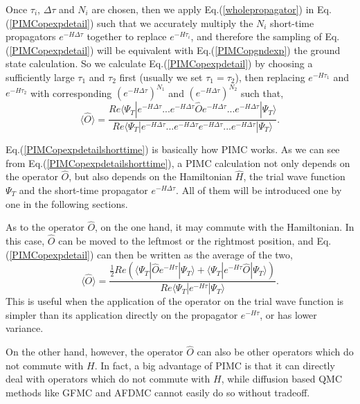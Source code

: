 \documentclass[12pt,letterpaper,UTF8]{report}
\begin{document}
Once $\tau_i$, $\Delta \tau$ and $N_i$ are chosen, then we apply Eq.(\ref{wholepropagator}) in Eq.(\ref{PIMCopexpdetail}) such that we accurately multiply the $N_i$ short-time propagators $e^{-H \Delta \tau}$ together to replace $e^{-H \tau_i}$, and therefore the sampling of Eq.(\ref{PIMCopexpdetail}) will be equivalent with Eq.(\ref{PIMCopgndexp}) the ground state calculation.
So we calculate Eq.(\ref{PIMCopexpdetail}) by choosing a sufficiently large $\tau_1$ and $\tau_2$ first (usually we set $\tau_1=\tau_2$), then replacing $e^{-H \tau_1}$ and $e^{-H \tau_2}$ with corresponding $(e^{-H \Delta \tau})^{N_1}$ and $(e^{-H \Delta \tau})^{N_2}$ such that,
\begin{equation}
\langle \hat{O} \rangle
= \frac{ Re  \langle \Psi_T| e^{-H \Delta \tau}...e^{-H \Delta \tau} \hat{O} e^{-H \Delta \tau} ...e^{-H \Delta \tau}| \Psi_T \rangle  }
{ Re \langle \Psi_T| e^{-H \Delta \tau}...e^{-H \Delta \tau} e^{-H \Delta \tau} ...e^{-H \Delta \tau} | \Psi_T \rangle} .
\label{PIMCopexpdetailshorttime}
\end{equation}

Eq.(\ref{PIMCopexpdetailshorttime}) is basically how PIMC works.
As we can see from Eq.(\ref{PIMCopexpdetailshorttime}), a PIMC calculation not only depends on the operator $\hat{O}$, but also depends on the Hamiltonian $\hat{H}$, the trial wave function $\Psi_T$ and the short-time propagator $e^{-H \Delta \tau}$. All of them will be introduced one by one in the following sections.

As to the operator $\hat{O}$, on the one hand, it may commute with the Hamiltonian. In this case, $\hat{O}$ can be moved to the leftmost or the rightmost position, and Eq.(\ref{PIMCopexpdetail}) can then be written as the average of the two,
\begin{equation}
\langle \hat{O} \rangle
= \frac{
\frac{1}{2}  Re \! \left( \!   \langle \Psi_T| \hat{O} e^{-H \tau}  | \Psi_T \rangle
\! + \!
 \langle \Psi_T|  e^{-H \tau} \hat{O} | \Psi_T \rangle
\! \right)
 }
{  Re \langle \Psi_T| e^{-H \tau} | \Psi_T \rangle}
.
\label{PIMCopexpdetailOH}
\end{equation}
This is useful when the application of the operator on the trial wave function is simpler than its application directly on the propagator $e^{-H \tau}$, or has lower variance.

On the other hand, however, the operator $\hat{O}$ can also be other operators which do not commute with $H$.
In fact, a big advantage of PIMC is that it can directly deal with operators which do not commute with $H$,
while diffusion based QMC methods like GFMC and AFDMC cannot easily do so without tradeoff.
\end{document}
